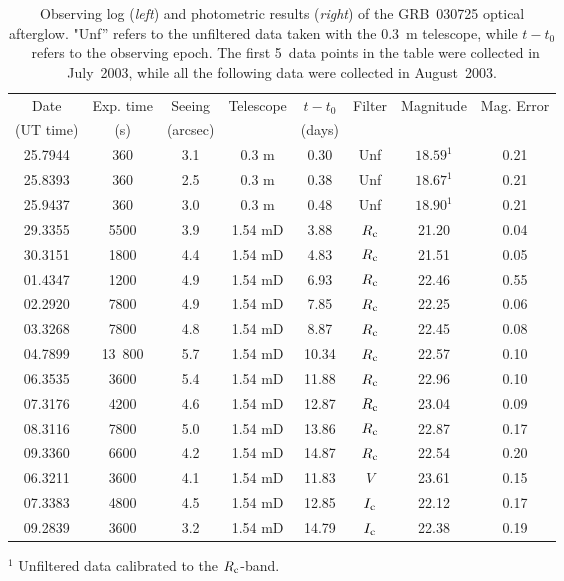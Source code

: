 \begin{table}%
\caption{Observing log ({\it left}) and photometric results ({\it right}) of the GRB~030725 optical 
afterglow. "Unf'' refers to the unfiltered data taken with the 0.3~m telescope, while 
$t - t_0$~refers to the observing epoch. The first 5~data points in the table were 
collected in July~2003, while all the following data were collected in August~2003.}
\label{phot}
{
\begin{tabular}{cccc||cccc}
\hline
\hline
Date & Exp. time & Seeing & Telescope  &  ${t-t_0}$ & 
 Filter & Magnitude & Mag. Error \\ 
(UT time) & (s) & (arcsec) & & (days) & & & \\
\hline
 25.7944 & 360   & 3.1 & 0.3 m  & 0.30  & {\rm Unf} & $18.59^{1}$ & 0.21 \\
 25.8393 & 360   & 2.5 & 0.3 m  & 0.38  & {\rm Unf} & $18.67^{1}$ & 0.21 \\
 25.9437 & 360   & 3.0 & 0.3 m  & 0.48  & {\rm Unf} & $18.90^{1}$ & 0.21 \\
\cline{1-8}
 29.3355 & 5500  & 3.9 & 1.54 mD & 3.88  & $R_{{\rm c}}$ & 21.20 & 0.04 \\
 30.3151 & 1800  & 4.4 & 1.54 mD & 4.83  & $R_{{\rm c}}$ & 21.51 & 0.05 \\
 01.4347 & 1200  & 4.9 & 1.54 mD & 6.93  & $R_{{\rm c}}$ & 22.46 & 0.55 \\
 02.2920 & 7800  & 4.9 & 1.54 mD & 7.85  & $R_{{\rm c}}$ & 22.25 & 0.06 \\
 03.3268 & 7800  & 4.8 & 1.54 mD & 8.87  & $R_{{\rm c}}$ & 22.45 & 0.08 \\
 04.7899 & 13~800 & 5.7 & 1.54 mD & 10.34 & $R_{{\rm c}}$ & 22.57 & 0.10 \\
 06.3535 & 3600  & 5.4 & 1.54 mD & 11.88 & $R_{{\rm c}}$ & 22.96 & 0.10 \\
 07.3176 & 4200  & 4.6 & 1.54 mD & 12.87 & $R_{{\rm c}}$ & 23.04 & 0.09 \\
 08.3116 & 7800  & 5.0 & 1.54 mD & 13.86 & $R_{{\rm c}}$ & 22.87 & 0.17 \\
 09.3360 & 6600  & 4.2 & 1.54 mD & 14.87 & $R_{{\rm c}}$ & 22.54 & 0.20 \\
 06.3211 & 3600  & 4.1 & 1.54 mD & 11.83 & $V$ & 23.61 & 0.15 \\
 07.3383 & 4800  & 4.5 & 1.54 mD & 12.85 & $I_{{\rm c}}$ & 22.12 & 0.17 \\
 09.2839 & 3600  & 3.2 & 1.54 mD & 14.79 & $I_{{\rm c}}$ & 22.38 & 0.19 \\
\hline
\end{tabular}}
\medskip
$^{1}$ Unfiltered data calibrated to the $R_{{\rm c}}$-band.
\end{table}